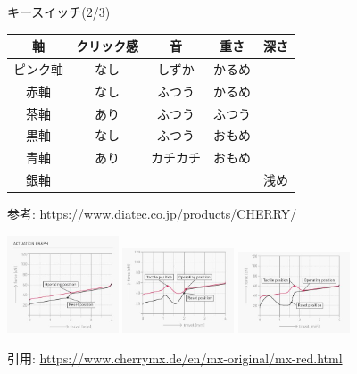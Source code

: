 \documentclass[cjk,dvipdfmx,10pt,compress,fragile%
hyperref={bookmarks=true,bookmarksnumbered=true,bookmarksopen=false,%
colorlinks=false,%
pdftitle={第 134 回 関西 Debian 勉強会},%
pdfauthor={小林},%
pdfsubject={資料},%
}]{beamer}
\begin{document}
\begin{frame}[fragile,t]{キースイッチ(2/3)}
 \vspace*{-1zw}
 \begin{center}
  \footnotesize
  \begin{tabular}[tb]{c|cccc}
   軸       & クリック感 & 音       & 重さ   & 深さ \\ \hline
   ピンク軸 & なし       & しずか   & かるめ\\
   赤軸     & なし       & ふつう   & かるめ\\
   茶軸     & あり       & ふつう   & ふつう\\
   黒軸     & なし       & ふつう   & おもめ \\
   青軸     & あり       & カチカチ & おもめ \\
   銀軸     &            &          &        & 浅め
  \end{tabular}
 \end{center}
 \begin{flushright}
  {\footnotesize 参考: \url{https://www.diatec.co.jp/products/CHERRY/}}
 \end{flushright}
 \begin{center}
  \includegraphics[keepaspectratio,width=3.3cm]{./img/actuation-red.jpg}
  \includegraphics[keepaspectratio,width=3.3cm]{./img/actuation-brown.jpg}
  \includegraphics[keepaspectratio,width=3.3cm]{./img/actuation-blue.jpg}
 \end{center}
 \begin{flushright}
  {\footnotesize 引用: \url{https://www.cherrymx.de/en/mx-original/mx-red.html}}
\end{flushright}
\end{frame}
\end{document}
